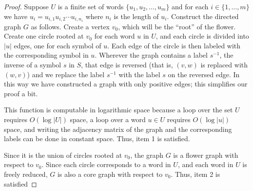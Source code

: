 \documentclass{elsarticlenonatbib}
\begin{document}
\begin{proof}
  Suppose $U$ is a finite set of words $\{u_1, u_2, \dotsc, u_m\}$ and for each $i \in \{1, \dotsc, m\}$ we have $u_i = u_{i, 1}u_{i, 2}\dotsb u_{i, n_i}$ where $n_i$ is the length of $u_i$.
  Construct the directed graph $G$ as follows.
  Create a vertex $v_0$, which will be the ``root'' of the flower.
  Create one circle rooted at $v_0$ for each word $u$ in $U$, and each circle is divided into $|u|$ edges, one for each symbol of $u$.
  Each edge of the circle is then labeled with the corresponding symbol in $u$.
  Wherever the graph contains a label $s^{-1}$, the inverse of a symbol $s$ in $S$, that edge is reversed (that is, $(v, w)$ is replaced with $(w, v)$) and we replace the label $s^{-1}$ with the label $s$ on the reversed edge.
  In this way we have constructed a graph with only positive edges; this simplifies our proof a bit.

  This function is computable in logarithmic space because a loop over the set $U$ requires $O(\log |U|)$ space, a loop over a word $u \in U$ requires $O(\log |u|)$ space, and writing the adjacency matrix of the graph and the corresponding labels can be done in constant space.
  Thus, item 1 is satisfied.

  Since it is the union of circles rooted at $v_0$, the graph $G$ is a flower graph with respect to $v_0$.
  Since each circle corresponds to a word in $U$, and each word in $U$ is freely reduced, $G$ is also a core graph with respect to $v_0$.
  Thus, item 2 is satisfied


\end{proof}
\end{document}
